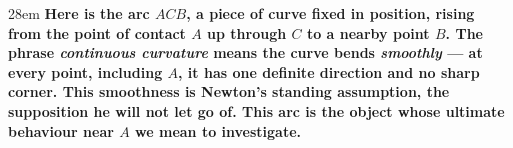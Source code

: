 \documentclass[border=4pt]{standalone}
\begin{document}
\begin{varwidth}{28em}
\large\bfseries
Here is \textcolor{arcblue}{the arc $ACB$}, a piece of curve fixed in position, rising from the point of contact $A$ up through $C$ to a nearby point $B$. The phrase \emph{continuous curvature} means the curve bends \emph{smoothly} — at every point, including $A$, it has one definite direction and no sharp corner. This smoothness is Newton's standing assumption, the supposition he will not let go of. \textcolor{arcblue}{This arc} is the object whose ultimate behaviour near $A$ we mean to investigate.
\end{varwidth}
\end{document}

